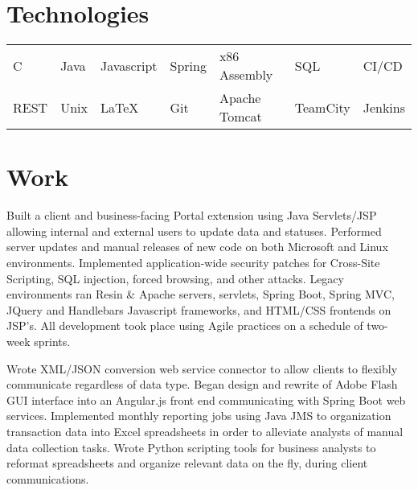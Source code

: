 \documentclass{my_cv}
\begin{document}

 \vspace{1mm}
 \vspace{1mm}

\section{Technologies}
 \begin{tabular}{l l l l l l l}
    C & Java & Javascript & Spring & x86 Assembly & SQL & CI/CD\\
    REST & Unix & \LaTeX{} & Git & Apache Tomcat & TeamCity & Jenkins
 \end{tabular}
 
\section{Work}
        {Built a client and business-facing Portal extension using Java Servlets/JSP allowing internal and external users to update data and statuses.} 
        {Performed server updates and manual releases of new code on both Microsoft and Linux environments.} 
        {Implemented application-wide security patches for Cross-Site Scripting, SQL injection, forced browsing, and other attacks.}
        {Legacy environments ran Resin \& Apache servers, servlets, Spring Boot, Spring MVC, JQuery and Handlebars
        Javascript frameworks, and HTML/CSS frontends on JSP's.}
        {All development took place using Agile practices on a schedule of two-week sprints.}

    {Wrote XML/JSON conversion web service connector to allow clients to flexibly communicate regardless of data type.}
    {Began design and rewrite of Adobe Flash GUI interface into an Angular.js front end communicating with Spring Boot web services.} 
    {Implemented monthly reporting jobs using Java JMS to organization transaction data into Excel spreadsheets in order to alleviate
    analysts of manual data collection tasks.}
    {Wrote Python scripting tools for business analysts to reformat spreadsheets and organize relevant data on the fly, during client communications.}
\end{document}
